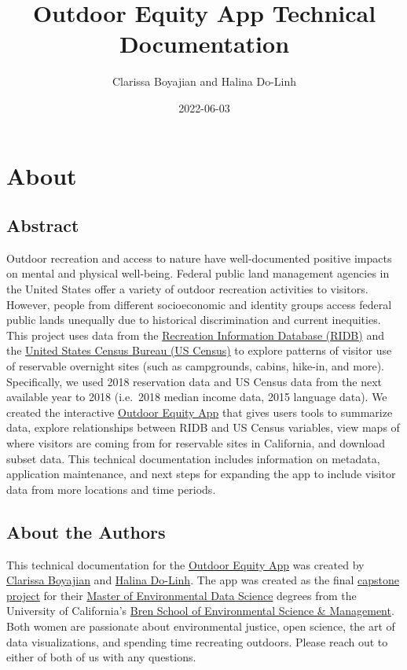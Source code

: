 \documentclass[
  11 pt,
  openany]{book}
\title{Outdoor Equity App Technical Documentation}
\author{Clarissa Boyajian and Halina Do-Linh}
\date{2022-06-03}
\begin{document}
\maketitle

{
\hypersetup{linkcolor=}
\setcounter{tocdepth}{1}
\tableofcontents
}
\hypertarget{about}{%
\chapter{About}\label{about}}

\hypertarget{abstract}{%
\section{Abstract}\label{abstract}}

Outdoor recreation and access to nature have well-documented positive impacts on mental and physical well-being. Federal public land management agencies in the United States offer a variety of outdoor recreation activities to visitors. However, people from different socioeconomic and identity groups access federal public lands unequally due to historical discrimination and current inequities. This project uses data from the \href{https://ridb.recreation.gov/landing}{Recreation Information Database (RIDB)} and the \href{https://www.census.gov/data.html}{United States Census Bureau (US Census)} to explore patterns of visitor use of reservable overnight sites (such as campgrounds, cabins, hike-in, and more). Specifically, we used 2018 reservation data and US Census data from the next available year to 2018 (i.e.~2018 median income data, 2015 language data). We created the interactive \href{https://shinyapps.bren.ucsb.edu/oe_app/}{Outdoor Equity App} that gives users tools to summarize data, explore relationships between RIDB and US Census variables, view maps of where visitors are coming from for reservable sites in California, and download subset data. This technical documentation includes information on metadata, application maintenance, and next steps for expanding the app to include visitor data from more locations and time periods.

\hypertarget{about-the-authors}{%
\section{About the Authors}\label{about-the-authors}}

This technical documentation for the \href{https://shinyapps.bren.ucsb.edu/oe_app/}{Outdoor Equity App} was created by \href{https://cboyajian.github.io/}{Clarissa Boyajian} and \href{https://hdolinh.github.io/}{Halina Do-Linh}. The app was created as the final \href{https://bren.ucsb.edu/projects/visualizing-visitor-use-trends-california-campsites-explore-equitable-access}{capstone project} for their \href{https://bren.ucsb.edu/masters-programs/master-environmental-data-science}{Master of Environmental Data Science} degrees from the University of California's \href{https://bren.ucsb.edu/}{Bren School of Environmental Science \& Management}. Both women are passionate about environmental justice, open science, the art of data visualizations, and spending time recreating outdoors. Please reach out to either of both of us with any questions.
\end{document}
